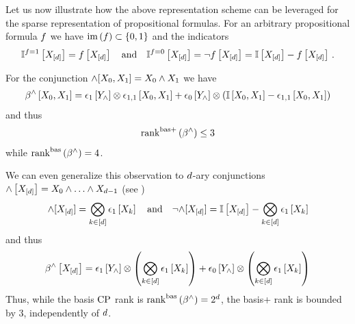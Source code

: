 \begin{example}
    Let us now illustrate how the above representation scheme can be leveraged for the sparse representation of propositional formulas.
    For an arbitrary propositional formula $f$ we have $\mathrm{im}\left(f\right)\subset\{0,1\}$ and the indicators
    \begin{align*}
        \mathbb{I}^{f=1}\left[X_{[d]}\right] = f\left[X_{[d]}\right] \quad \text{and} \quad
        \mathbb{I}^{f=0}\left[X_{[d]}\right] = \lnot f\left[X_{[d]}\right] = \mathbb{I}\left[X_{[d]}\right] - f\left[X_{[d]}\right] \, .
    \end{align*}

    For the conjunction $\land[X_{0},X_{1}] = X_{0} \land X_{1}$ we have
    \begin{align*}
        \beta^{\land}\left[X_{0},X_{1}\right]
        = \epsilon_{1}\left[Y_{\land}\right] \otimes \epsilon_{1,1}\left[X_{0},X_{1}\right]
        + \epsilon_{0}\left[Y_{\land}\right] \otimes (\mathbb{I}\left[X_{0},X_{1}\right] - \epsilon_{1,1}\left[X_{0},X_{1}\right])
    \end{align*}
    and thus
    \begin{align*}
        \mathrm{rank}^{\mathrm{bas+}}\left(\beta^{\land}\right) \leq 3
    \end{align*}
    while $\mathrm{rank}^{\mathrm{bas}}\left(\beta^{\land}\right) = 4$.

    We can even generalize this observation to $d$-ary conjunctions $\land\left[X_{[d]}\right]=X_{0}\land\ldots\land X_{d-1}$ (see )
    \begin{align*}
    {\land}[X_{[d]}]
        = \bigotimes_{k\in[d]} \epsilon_{1}\left[X_{k}\right]
        \quad \text{and} \quad
        {\lnot\land}[X_{[d]}] = \mathbb{I}\left[X_{[d]}\right] - \bigotimes_{k\in[d]} \epsilon_{1}\left[X_{k}\right]
    \end{align*}
    and thus
    \begin{align*}
        \beta^{\land}\left[X_{[d]}\right] =
        \epsilon_{1}\left[Y_{\land}\right] \otimes \left(\bigotimes_{k\in[d]} \epsilon_{1}\left[X_{k}\right]\right)
        + \epsilon_{0}\left[Y_{\land}\right] \otimes \left(\bigotimes_{k\in[d]} \epsilon_{1}\left[X_{k}\right]\right)
    \end{align*}
    Thus, while the basis $\mathrm{CP}$ rank is $\mathrm{rank}^{\mathrm{bas}}\left(\beta^{\land}\right)=2^{d}$, the basis+ rank is bounded by $3$, independently of $d$.
\end{example}






